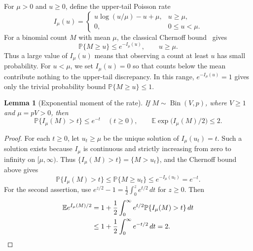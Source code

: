 \documentclass[11pt,reqno]{amsart}
\numberwithin{equation}{section}
\newtheorem{lemma}[theorem]{Lemma}
\theoremstyle{definition}
\theoremstyle{remark}
\newcommand{\E}{\mathbb E}
\newcommand{\Pp}{\mathbb P}
\begin{document}
For $\mu>0$ and $u\ge0$, define the upper-tail Poisson rate
\begin{equation}\label{eq:rate}
 I_\mu(u)=
 \begin{cases}
 u\log(u/\mu)-u+\mu,&u\ge\mu,\\
 0,&0\le u<\mu.
 \end{cases}
\end{equation}
For a binomial count $M$ with mean $\mu$, the classical Chernoff
bound~\cite[Theorem~2.3.1]{V26} gives
\[
 \Pp\{M\ge u\}\le e^{-I_\mu(u)},\qquad u\ge\mu.
\]
Thus a large value of $I_\mu(u)$ means
that observing a count at least $u$ has small probability.
For $u<\mu$, we set $I_\mu(u)=0$ so that counts below the mean
contribute nothing to the upper-tail discrepancy. In this range,
$e^{-I_\mu(u)}=1$ gives only the trivial probability bound
$\Pp\{M\ge u\}\le1$.

\begin{lemma}[Exponential moment of the rate]\label{lem:rate}
If $M\sim\operatorname{Bin}(V,p)$, where $V\ge1$ and $\mu=pV>0$, then
\[
 \Pp\{I_\mu(M)>t\}\le e^{-t}\quad(t\ge0),
 \qquad
 \E\exp\bigl(I_\mu(M)/2\bigr)\le2.
\]
\end{lemma}
\begin{proof}
For each $t\ge0$, let $u_t\ge\mu$ be the unique solution of
$I_\mu(u_t)=t$. Such a solution exists because $I_\mu$ is continuous
and strictly increasing from zero to infinity on $[\mu,\infty)$.
Thus $\{I_\mu(M)>t\}=\{M>u_t\}$, and the Chernoff bound above gives
\[
 \Pp\{I_\mu(M)>t\}
 \le\Pp\{M\ge u_t\}
 \le e^{-I_\mu(u_t)}=e^{-t}.
\]
For the second assertion, use
$e^{z/2}-1=\frac12\int_0^z e^{t/2}\,dt$ for $z\ge0$.
Then
\begin{align*}
 \E e^{I_\mu(M)/2}
 &=1+\frac12\int_0^\infty e^{t/2}
             \Pp\{I_\mu(M)>t\}\,dt\\
 &\le1+\frac12\int_0^\infty e^{-t/2}\,dt=2.
 \qedhere
\end{align*}
\end{proof}
\end{document}
